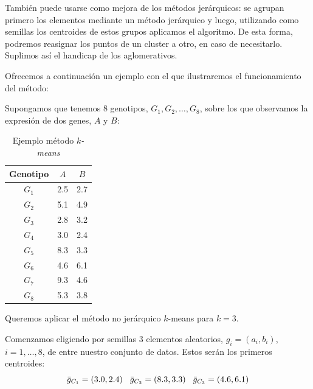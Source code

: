 También puede usarse como mejora de los métodos jerárquicos: se agrupan primero los elementos mediante un método jerárquico y luego, utilizando como semillas los centroides de estos grupos
aplicamos el algoritmo. De esta forma, podremos reasignar los puntos de un cluster a otro, en caso de necesitarlo. Suplimos así el handicap de los aglomerativos. \newline

Ofrecemos a continuación un ejemplo con el que ilustraremos el funcionamiento del método:

\begin{ejemplo}
    Supongamos que tenemos $8$ genotipos, $G_{1}, G_{2},\dots,G_{8}$, sobre los que observamos la expresión de dos genes, $A$ y $B$:

    \begin{table}[h]
        \centering
        \begin{tabular}{|c|c|c|}
            \hline
            \textbf{Genotipo} & \textbf{$A$} & \textbf{$B$} \\
            \hline
            $G_{1}$ & 2.5 & 2.7 \\
            \hline
            $G_{2}$ & 5.1 & 4.9 \\
            \hline
            $G_{3}$ & 2.8 & 3.2 \\
            \hline
            $G_{4}$ & 3.0 & 2.4 \\
            \hline
            $G_{5}$ & 8.3 & 3.3 \\
            \hline
            $G_{6}$ & 4.6 & 6.1 \\
            \hline
            $G_{7}$ & 9.3 & 4.6 \\
            \hline
            $G_{8}$ & 5.3 & 3.8\\
            \hline
            
        \end{tabular}
        \caption{Ejemplo método \textit{$k$-means}}

    \end{table}

    Queremos aplicar el método no jerárquico $k$-means para $k=3$. \newline

    Comenzamos eligiendo por semillas $3$ elementos aleatorios, $g_{i} = (a_{i},b_{i})$, $i=1,\dots,8$, de entre nuestro conjunto de datos. Estos
    serán los primeros centroides:
    \[
    \bar{g}_{C_{1}} = (3.0,2.4) \hspace{0.3cm} \bar{g}_{C_{2}} = (8.3,3.3) \hspace{0.3cm} \bar{g}_{C_{3}} = (4.6,6.1)
    \]


\end{ejemplo}
